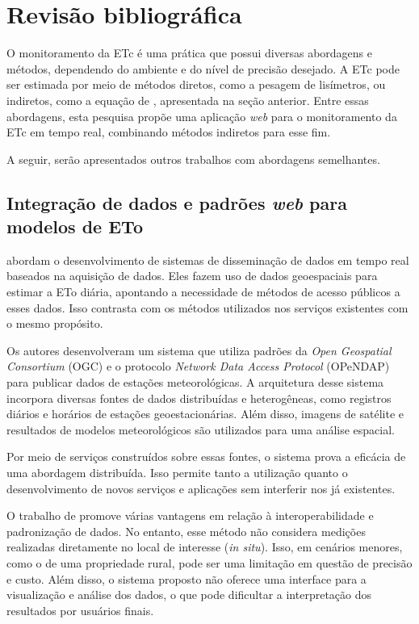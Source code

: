 \section{Revisão bibliográfica}

O monitoramento da ETc é uma prática que possui diversas abordagens e métodos, dependendo do ambiente e do nível de precisão desejado. A ETc pode ser estimada por meio de métodos diretos, como a pesagem de lisímetros, ou indiretos, como a equação de \textcite{Allen_evapotranspiration1998}, apresentada na seção anterior. Entre essas abordagens, esta pesquisa propõe uma aplicação \textit{web} para o monitoramento da ETc em tempo real, combinando métodos indiretos para esse fim.

A seguir, serão apresentados outros trabalhos com abordagens semelhantes.

\subsection{Integração de dados e padrões \textit{web} para modelos de ETo}

\textcite{Jianting_webeva2009} abordam o desenvolvimento de sistemas de disseminação de dados em tempo real baseados na aquisição de dados. Eles fazem uso de dados geoespaciais para estimar a ETo diária, apontando a necessidade de métodos de acesso públicos a esses dados. Isso contrasta com os métodos utilizados nos serviços existentes com o mesmo propósito.

Os autores desenvolveram um sistema que utiliza padrões da \textit{Open Geospatial Consortium} (OGC) e o protocolo \textit{Network Data Access Protocol} (OPeNDAP) para publicar dados de estações meteorológicas. A arquitetura desse sistema incorpora diversas fontes de dados distribuídas e heterogêneas, como registros diários e horários de estações geoestacionárias. Além disso, imagens de satélite e resultados de modelos meteorológicos são utilizados para uma análise espacial. 

Por meio de serviços construídos sobre essas fontes, o sistema prova a eficácia de uma abordagem distribuída. Isso permite tanto a utilização quanto o desenvolvimento de novos serviços e aplicações sem interferir nos já existentes.

O trabalho de \textcite{Jianting_webeva2009} promove várias vantagens em relação à interoperabilidade e padronização de dados. No entanto, esse método não considera medições realizadas diretamente no local de interesse (\textit{in situ}). Isso, em cenários menores, como o de uma propriedade rural, pode ser uma limitação em questão de precisão e custo. Além disso, o sistema proposto não oferece uma interface para a visualização e análise dos dados, o que pode dificultar a interpretação dos resultados por usuários finais.

